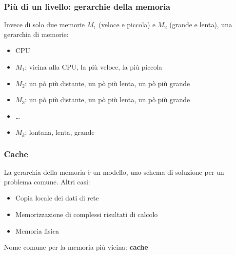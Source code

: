 \documentclass[12pt,a4paper]{article}
\begin{document}
\subsubsection{Più di un livello: gerarchie della memoria}
Invece di solo due memorie $M_1$ (veloce e piccola) e $M_2$ (grande e lenta), una gerarchia di memorie:
\begin{itemize}
\item CPU
\item $M_1$: vicina alla CPU, la più veloce, la più piccola
\item $M_2$: un pò più distante, un pò più lenta, un pò più grande
\item $M_3$: un pò più distante, un pò più lenta, un pò più grande
\item \dots
\item $M_k$: lontana, lenta, grande
\end{itemize}
\begin{center}
\end{center}

\subsubsection{Cache}
La gerarchia della memoria è un modello, uno schema di soluzione per un problema comune. Altri casi:
\begin{itemize}
\item Copia locale dei dati di rete
\item Memorizzazione di complessi risultati di calcolo
\item Memoria fisica
\end{itemize}
Nome comune per la memoria più vicina: \textbf{cache}
\end{document}
